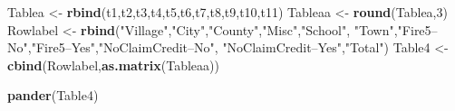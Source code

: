 \documentclass[]{book}
\newenvironment{Shaded}{\begin{snugshade}}{\end{snugshade}}
\newcommand{\KeywordTok}[1]{\textcolor[rgb]{0.13,0.29,0.53}{\textbf{#1}}}
\newcommand{\DecValTok}[1]{\textcolor[rgb]{0.00,0.00,0.81}{#1}}
\newcommand{\StringTok}[1]{\textcolor[rgb]{0.31,0.60,0.02}{#1}}
\newcommand{\NormalTok}[1]{#1}
\theoremstyle{definition}
\theoremstyle{definition}
\theoremstyle{definition}
\theoremstyle{remark}
\begin{document}
\begin{Shaded}
\begin{Highlighting}[]
\NormalTok{Tablea <-}\StringTok{ }\KeywordTok{rbind}\NormalTok{(t1,t2,t3,t4,t5,t6,t7,t8,t9,t10,t11)}
\NormalTok{Tableaa <-}\StringTok{ }\KeywordTok{round}\NormalTok{(Tablea,}\DecValTok{3}\NormalTok{)}
\NormalTok{Rowlabel <-}\StringTok{ }\KeywordTok{rbind}\NormalTok{(}\StringTok{"Village"}\NormalTok{,}\StringTok{"City"}\NormalTok{,}\StringTok{"County"}\NormalTok{,}\StringTok{"Misc"}\NormalTok{,}\StringTok{"School"}\NormalTok{,}
                  \StringTok{"Town"}\NormalTok{,}\StringTok{"Fire5--No"}\NormalTok{,}\StringTok{"Fire5--Yes"}\NormalTok{,}\StringTok{"NoClaimCredit--No"}\NormalTok{,}
                  \StringTok{"NoClaimCredit--Yes"}\NormalTok{,}\StringTok{"Total"}\NormalTok{)}
\NormalTok{Table4 <-}\StringTok{ }\KeywordTok{cbind}\NormalTok{(Rowlabel,}\KeywordTok{as.matrix}\NormalTok{(Tableaa))}
\end{Highlighting}
\end{Shaded}

\begin{Shaded}
\begin{Highlighting}[]
\KeywordTok{pander}\NormalTok{(Table4)}
\end{Highlighting}
\end{Shaded}
\end{document}

